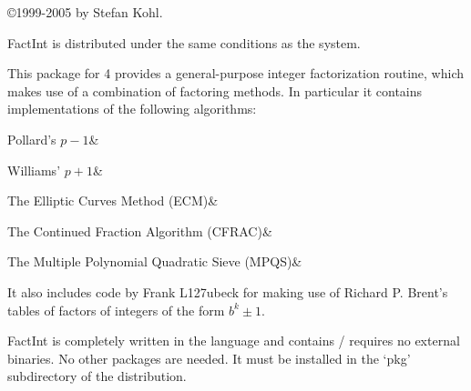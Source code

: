 
\copyright 1999-2005 by Stefan Kohl.

{\sf FactInt} is distributed under the same conditions as the {\GAP}
system.

This package for {\GAP} 4 provides a general-purpose integer
factorization routine, which makes use of a combination of factoring
methods. In particular it contains implementations of the following
algorithms:

\beginitems
Pollard's $p-1$&

Williams' $p+1$&

The Elliptic Curves Method (ECM)&

The Continued Fraction Algorithm (CFRAC)&

The Multiple Polynomial Quadratic Sieve (MPQS)&
\enditems

It also includes code by Frank L\accent127ubeck for making use of
Richard P. Brent's tables of factors of integers of the form $b^k \pm 1$.

{\sf FactInt} is completely written in the {\GAP} language and contains /
requires no external binaries. No other packages are needed.
It must be installed in the `pkg' subdirectory of the
{\GAP} distribution.


